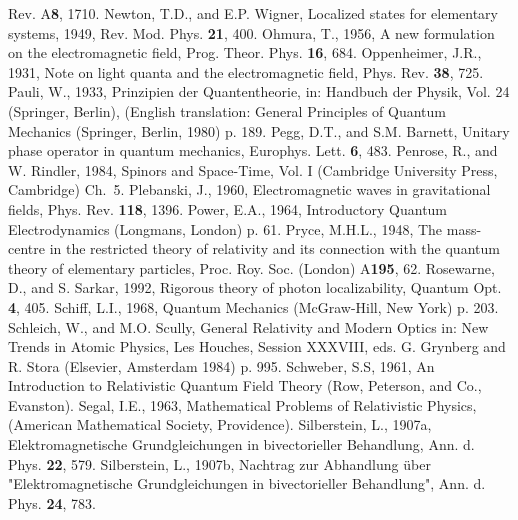 \documentclass[11pt]{article}
\begin{document}
\begin{thebibliography}{References}
Rev. A{\bf 8}, 1710.
 Newton, T.D., and E.P. Wigner,
Localized states for elementary systems, 1949, Rev. Mod. Phys. {\bf 21},
400.
 Ohmura, T., 1956, A new formulation on
the electromagnetic field, Prog. Theor. Phys. {\bf 16}, 684.
 Oppenheimer, J.R., 1931, Note
on light quanta and the electromagnetic field, Phys. Rev. {\bf 38}, 725.
 Pauli, W., 1933, Prinzipien der
Quantentheorie, in: Handbuch der Physik, Vol. 24 (Springer, Berlin),
(English translation: General Principles of Quantum Mechanics (Springer,
Berlin, 1980) p. 189.
 Pegg, D.T., and S.M. Barnett,
Unitary phase operator in quantum mechanics, Europhys. Lett. {\bf 6}, 483.
 Penrose, R., and W. Rindler,
1984, Spinors and Space-Time, Vol. I (Cambridge University Press, Cambridge)
Ch.~5.
 Plebanski, J., 1960,
Electromagnetic waves in gravitational fields, Phys. Rev. {\bf 118}, 1396.
 Power, E.A., 1964, Introductory Quantum
Electrodynamics (Longmans, London) p. 61.
 Pryce, M.H.L., 1948, The mass-centre in
the restricted theory of relativity and its connection with the quantum
theory of elementary particles, Proc. Roy. Soc. (London) A{\bf 195}, 62.
 Rosewarne, D., and S. Sarkar,
1992, Rigorous theory of photon localizability, Quantum Opt. {\bf 4}, 405.
 Schiff, L.I., 1968, Quantum Mechanics
(McGraw-Hill, New York) p. 203.
 Schleich, W., and M.O. Scully,
General Relativity and Modern Optics in: New Trends in Atomic Physics, Les
Houches, Session XXXVIII, eds. G. Grynberg and R. Stora (Elsevier, Amsterdam
1984) p. 995.
 Schweber, S.S, 1961, An
Introduction to Relativistic Quantum Field Theory (Row, Peterson, and Co.,
Evanston).
 Segal, I.E., 1963, Mathematical Problems
of Relativistic Physics, (American Mathematical Society, Providence).
 Silberstein, L., 1907a,
Elektromagnetische Grundgleichungen in bivectorieller Behandlung, Ann. d.
Phys. {\bf 22}, 579.
 Silberstein, L., 1907b,
Nachtrag zur Abhandlung \"uber "Elektromagnetische Grundgleichungen in
bivectorieller Behandlung", Ann. d. Phys. {\bf 24}, 783.

\end{thebibliography}
\end{document}
